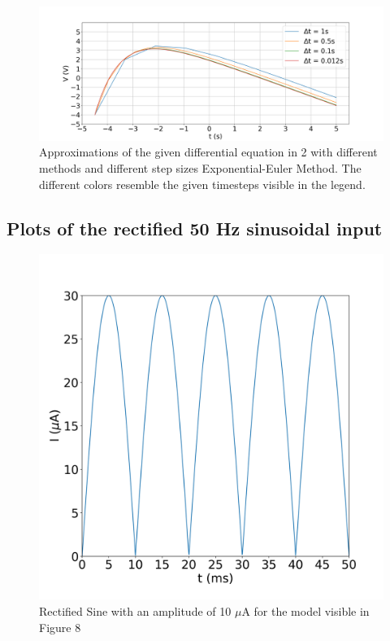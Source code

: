 \documentclass{scrartcl}			%
\begin{document}
\begin{figure}[hbpt!]					%
	 \begin{flushleft}
		\hspace*{-0.7in}
		\includegraphics[scale=0.4]{1_3.png}
		\captionsetup{width=\linewidth}  %
		\caption{Approximations of the given differential equation in 2 with different methods and different step sizes Exponential-Euler Method. The different colors resemble the given timesteps visible in the legend.}
		\label{subsec_fig1_3} %
	 \end{flushleft}
\end{figure}


\newpage
\subsection{Plots of the rectified 50 Hz sinusoidal input}
\begin{figure}[hbpt!]					%
	\centering
	\includegraphics[scale=0.33]{2_1.png}
	\captionsetup{width=\linewidth}  %
	\caption{Rectified Sine with an amplitude of 10 $\mu$A for the model visible in Figure 8}
	\label{subsec_fig2_0} %
\end{figure}
\end{document}
